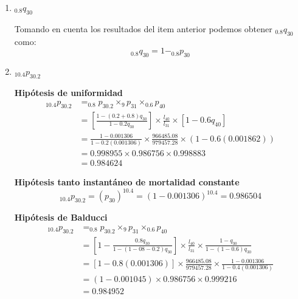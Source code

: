 \documentclass[12pt,a4paper,oneside]{article}\usepackage[]{graphicx}\usepackage[]{color}
\begin{document}
\begin{enumerate}
\begin{enumerate}
      {\bf\scriptsize \ttfamily Hipótesis de uniformidad}
      \[_{0.8}p_{30} = 1- _{0.8}q_{30} = 1-0.8q_{30}=1-0.8(0.001306)=0.998955\]
      
      {\bf\scriptsize \ttfamily Hipótesis tanto instantáneo de mortalidad constante}
      \[_{0.8}p_{30} = (1-q_{30})^{0.8}=(1-0.001306)^{0.8}=0.998955\]
      
      {\bf\scriptsize \ttfamily Hipótesis de Balducci}
      \[_{0.8}p_{30} = \frac{1-q_{30}}{1-(1-0.8)q_{30}}=\frac{1-0.001306}{1-0.2(0.001306)}=0.998955\]
      
      \item $_{0.8}q_{30}$
      
      Tomando en cuenta los resultados del item anterior podemos obtener $_{0.8}q_{30}$ como:
      \[ _{0.8}q_{30}= 1- _{0.8}p_{30}\]

      \item $_{10.4}p_{30.2}$
      
      {\bf\scriptsize \ttfamily Hipótesis de uniformidad}
      \begin{align*} 
      _{10.4}p_{30.2} & = _{0.8}p_{30.2}\times _{9}p_{31}\times _{0.6}p_{40} \\
                      & = \left[\frac{1-(0.2+0.8)q_{30}}{1-0.2q_{30}}\right] \times \frac{l_{40}}{l_{31}} \times \left[1-0.6q_{40}\right]\\
                      & = \frac{1-0.001306}{1-0.2(0.001306)}\times \frac{966485.08}{979457.28} \times (1-0.6(0.001862))\\
                      & =  0.998955 \times 0.986756 \times 0.998883\\
                      & = 0.984624
      \end{align*}
      
      {\bf\scriptsize \ttfamily Hipótesis tanto instantáneo de mortalidad constante}
      \[_{10.4}p_{30.2} = (p_{30})^{10.4}=(1-0.001306)^{10.4}=0.986504\]
      
      {\bf\scriptsize \ttfamily Hipótesis de Balducci}
      \begin{align*} 
      _{10.4}p_{30.2} & = _{0.8}p_{30.2}\times _{9}p_{31}\times _{0.6}p_{40} \\
                      & = \left[1-\frac{0.8q_{30}}{1-(1-08-0.2)q_{30}}\right]\times \frac{l_{40}}{l_{31}}\times \frac{1-q_{30}}{1-(1-0.6)q_{30}}\\
                      & = \left[1-0.8(0.001306)\right]\times \frac{966485.08}{979457.28} \times \frac{1-0.001306}{1-0.4(0.001306)}\\
                      & =  (1-0.001045) \times 0.986756 \times 0.999216\\
                      & =  0.984952
      \end{align*}
      

\end{enumerate}
\end{enumerate}
\end{document}
